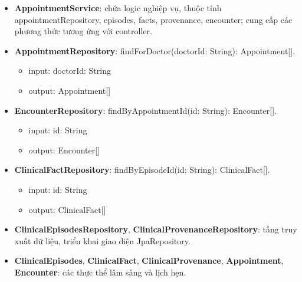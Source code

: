 \begin{itemize}[label=\textbullet, itemsep=0.4em]
\begin{itemize}[label=$\circ$, itemsep=0.2em, leftmargin=1.5em]
    \begin{itemize}[label=$\blacksquare$, itemsep=0.1em, leftmargin=1.5em]
      \item input: id: String
    \end{itemize}
    \item \textbf{changeEpisode(id: String, when: date, reason: String)}
    \begin{itemize}[label=$\blacksquare$, itemsep=0.1em, leftmargin=1.5em]
      \item input: id: String, when: date, reason: String
    \end{itemize}
  \end{itemize}
  \item \textbf{AppointmentService}: chứa logic nghiệp vụ, thuộc tính appointmentRepository, episodes, facts, provenance, encounter; cung cấp các phương thức tương ứng với controller.
  \item \textbf{AppointmentRepository}: findForDoctor(doctorId: String): Appointment[].
  \begin{itemize}[label=$\blacksquare$, itemsep=0.1em, leftmargin=1.5em]
    \item input: doctorId: String
    \item output: Appointment[]
  \end{itemize}
  \item \textbf{EncounterRepository}: findByAppointmentId(id: String): Encounter[].
  \begin{itemize}[label=$\blacksquare$, itemsep=0.1em, leftmargin=1.5em]
    \item input: id: String
    \item output: Encounter[]
  \end{itemize}
  \item \textbf{ClinicalFactRepository}: findByEpisodeId(id: String): ClinicalFact[].
  \begin{itemize}[label=$\blacksquare$, itemsep=0.1em, leftmargin=1.5em]
    \item input: id: String
    \item output: ClinicalFact[]
  \end{itemize}
  \item \textbf{ClinicalEpisodesRepository}, \textbf{ClinicalProvenanceRepository}: tầng truy xuất dữ liệu, triển khai giao diện JpaRepository.
  \item \textbf{ClinicalEpisodes}, \textbf{ClinicalFact}, \textbf{ClinicalProvenance}, \textbf{Appointment}, \textbf{Encounter}: các thực thể lâm sàng và lịch hẹn.
\end{itemize}

